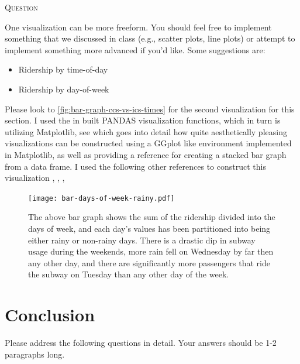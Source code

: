 \documentclass{article}
\newcounter{questionCtr}
\newenvironment{question}{%
   \bigskip\noindent%
   \refstepcounter{questionCtr}%
   \textsc{Question \thequestionCtr}%
   \newline%
   }{\par\bigskip}  %
\numberwithin{questionCtr}{section}
\numberwithin{problemCtr}{section}
\begin{document}
\begin{question}
  One visualization can be more freeform. You should feel free to implement
  something that we discussed in class (e.g., scatter plots, line plots) or
  attempt to implement something more advanced if you'd like. Some suggestions
  are:
  \begin{itemize}
    \item Ridership by time-of-day
    \item Ridership by day-of-week
  \end{itemize}
\end{question}

Please look to \autoref{fig:bar-graph-ccs-vs-ics-times} for the second
visualization for this section.  I used the in built PANDAS visualization
functions, which in turn is utilizing Matplotlib, see
\cite{PANDAS-visualization} which goes into detail how quite aesthetically
pleasing visualizations can be constructed using a GGplot like environment
implemented in Matplotlib, as well as providing a reference for creating a
stacked bar graph from a data frame.  I used the following other references to
construct this visualization \cite{Stackoverflow-pandas-savefig},
\cite{PANDAS-index-select-data},
\cite{Stackoverflow-pandas-filter-multiple-columns}, \cite{PANDAS-data-frame}

\begin{figure}[ht]
  \centering
  \texttt{[image: bar-days-of-week-rainy.pdf]}
  \caption{The above bar graph shows the sum of the ridership divided into the
    days of week, and each day's values has been partitioned into being either
    rainy or non-rainy days.  There is a drastic dip in subway usage during the
    weekends, more rain fell on Wednesday by far then any other day, and there are
    significantly more passengers that ride the subway on Tuesday than any other
  day of the week.}
\label{fig:bar-days-of-week-rainy}
\end{figure}
\section{Conclusion}
Please address the following questions in detail. Your answers should be 1-2
paragraphs long.
\end{document}
